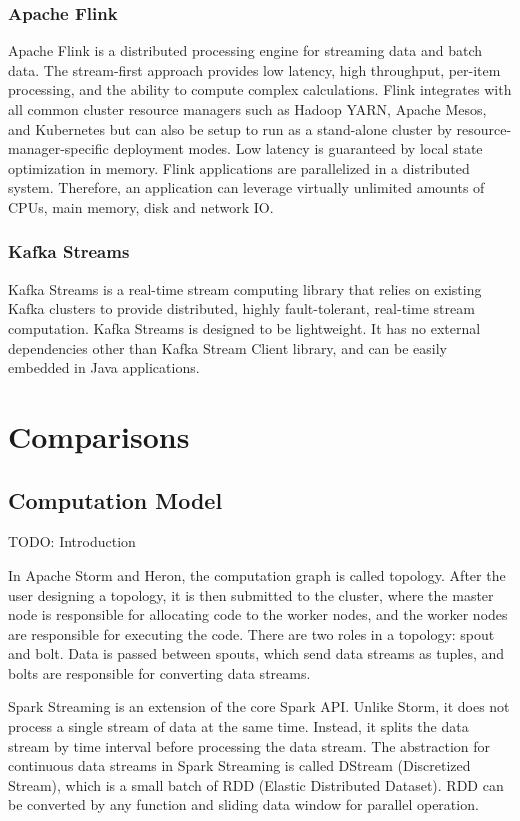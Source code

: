\documentclass[pdftex,twocolumn,10pt,letterpaper]{article}
\begin{document}
\subsubsection{Apache Flink}

Apache Flink is a distributed processing engine for streaming data and batch data. The stream-first approach provides low latency, high throughput, per-item processing, and the ability to compute complex calculations. Flink integrates with all common cluster resource managers such as Hadoop YARN, Apache Mesos, and Kubernetes but can also be setup to run as a stand-alone cluster by resource-manager-specific deployment modes. Low latency is guaranteed by local state optimization in memory. Flink applications are parallelized in a distributed system. Therefore, an application can leverage virtually unlimited amounts of CPUs, main memory, disk and network IO. 

\subsubsection{Kafka Streams}
Kafka Streams is a real-time stream computing library that relies on existing Kafka clusters to provide distributed, highly fault-tolerant, real-time stream computation. Kafka Streams is designed to be lightweight. It has no external dependencies other than Kafka Stream Client library, and can be easily embedded in Java applications. 

\section{Comparisons}

\subsection{Computation Model}

TODO: Introduction

In Apache Storm and Heron, the computation graph is called topology. After the user designing a topology, it is then submitted to the cluster, where the master node is responsible for allocating code to the worker nodes, and the worker nodes are responsible for executing the code. There are two roles in a topology: spout and bolt. Data is passed between spouts, which send data streams as  tuples, and bolts are responsible for converting data streams.

Spark Streaming is an extension of the core Spark API. Unlike Storm, it does not process a single stream of data at the same time. Instead, it splits the data stream by time interval before processing the data stream. The abstraction for continuous data streams in Spark Streaming is called DStream (Discretized Stream), which is a small batch of RDD (Elastic Distributed Dataset). RDD can be converted by any function and sliding data window for parallel operation.
\end{document}
